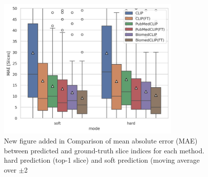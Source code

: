 \documentclass[bioengineering,article,submit,pdftex,moreauthors]{Definitions/mdpi}
\begin{document}
\begin{figure}[ht]
  \centering
  \includegraphics[width=0.8\textwidth]{./figures/mae.png}
  \caption{
    New figure added in 
    Comparison of mean absolute error (MAE) between predicted and ground-truth slice indices for each method. 
     hard prediction (top-1 slice) and soft prediction (moving average over $\pm$2 
  }
  \label{fig:mae}
\end{figure}
\end{document}

